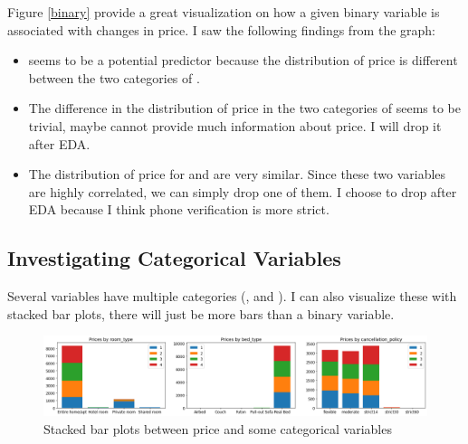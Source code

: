 \documentclass[11pt]{article}
\begin{document}
Figure \ref{binary} provide a great visualization on how a given binary variable is associated with changes in price. I saw the following findings from the graph:
\begin{itemize}
    \item {} seems to be a potential predictor because the distribution of price is different between the two categories of .
    \item The difference in the distribution of price in the two categories of  seems to be trivial, maybe  cannot provide much information about price. I will drop it after EDA. 
    \item The distribution of price for  and \newline {} are very similar. Since these two variables are highly correlated, we can simply drop one of them. I choose to drop  after EDA because I think phone verification is more strict.
\end{itemize}

\subsection{Investigating Categorical Variables}

Several variables have multiple categories (,  and ). I can also visualize these with stacked bar plots, there will just be more bars than a binary variable. 

\begin{figure}[H]
    \caption{Stacked bar plots between price and some categorical variables}
    \label{categorical}
    \centering
    \includegraphics[width=1.15\textwidth]{../img/categorical.png}
\end{figure}
\end{document}
